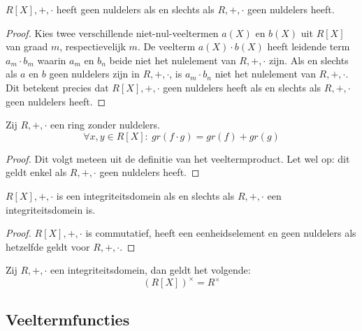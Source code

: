 \documentclass[main.tex]{subfiles}
\begin{document}
\begin{st}
  $R[X],+,\cdot$ heeft geen nuldelers als en slechts als $R,+,\cdot$ geen nuldelers heeft.

  \begin{proof}
    Kies twee verschillende niet-nul-veeltermen $a(X)$ en $b(X)$ uit $R[X]$ van graad $m$, respectievelijk $m$.
    De veelterm $a(X)\cdot b(X)$ heeft leidende term $a_{m}\cdot b_{m}$ waarin $a_{m}$ en $b_{n}$ beide niet het nulelement van $R,+,\cdot$ zijn.
    Als en slechts als $a$ en $b$ geen nuldelers zijn in $R,+,\cdot$, is $a_{m}\cdot b_{n}$ niet het nulelement van $R,+,\cdot$.
    Dit betekent precies dat $R[X],+,\cdot$ geen nuldelers heeft als en slechts als $R,+,\cdot$ geen nuldelers heeft.
  \end{proof}
\end{st}

\begin{st}
  \label{st:veeltermen-geen-nuldelers-asa-ring-geen-nuldelers}
  Zij $R,+,\cdot$ een ring zonder nuldelers.
  \[ \forall x,y \in R[X]:\ gr(f\cdot g) = gr(f) + gr(g) \]

  \begin{proof}
    Dit volgt meteen uit de definitie van het veeltermproduct.
    Let wel op: dit geldt enkel als $R,+,\cdot$ geen nuldelers heeft.
  \end{proof}
\end{st}

\begin{gev}
  \label{gev:veeltermen-domein-asa-ring-domein}
  $R[X],+,\cdot$ is een integriteitsdomein als en slechts als $R,+,\cdot$ een integriteitsdomein is.

  \begin{proof}
    $R[X],+,\cdot$ is commutatief, heeft een eenheidselement en geen nuldelers als hetzelfde geldt voor $R,+,\cdot$.
  \end{proof}
\end{gev}

\begin{st}
  Zij $R,+,\cdot$ een integriteitsdomein, dan geldt het volgende:
  \[ (R[X])^{\times} = R^{\times} \]
\end{st}


\subsection{Veeltermfuncties}
\label{sec:veeltermfuncties}
\end{document}

